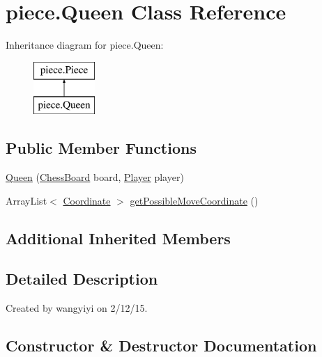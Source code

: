 \hypertarget{classpiece_1_1_queen}{}\section{piece.\+Queen Class Reference}
\label{classpiece_1_1_queen}
Inheritance diagram for piece.\+Queen\+:\begin{figure}[H]
\begin{center}
\leavevmode
\includegraphics[height=2.000000cm]{classpiece_1_1_queen}
\end{center}
\end{figure}
\subsection*{Public Member Functions}
\begin{DoxyCompactItemize}
\item 
\hyperlink{classpiece_1_1_queen_ab07236b4d2d74af4752527d4be4d0e37}{Queen} (\hyperlink{classchessboard_1_1_chess_board}{Chess\+Board} board, \hyperlink{enumchessboard_1_1_player}{Player} player)
\item 
Array\+List$<$ \hyperlink{classpiece_1_1_coordinate}{Coordinate} $>$ \hyperlink{classpiece_1_1_queen_acaedb2b5fe8ca1ffac745ef059d2466c}{get\+Possible\+Move\+Coordinate} ()
\end{DoxyCompactItemize}
\subsection*{Additional Inherited Members}


\subsection{Detailed Description}
Created by wangyiyi on 2/12/15. 

\subsection{Constructor \& Destructor Documentation}
\hypertarget{classpiece_1_1_queen_ab07236b4d2d74af4752527d4be4d0e37}{}
